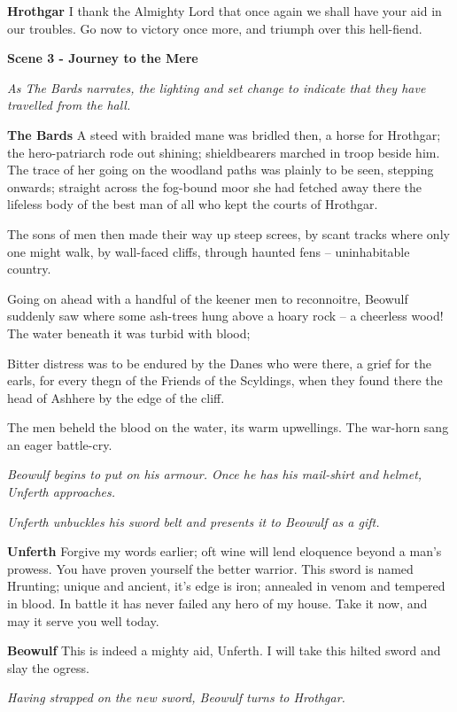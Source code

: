 \documentclass[a4paper]{article}
\begin{document}
{\textbf{Hrothgar} I thank the Almighty Lord
that once again we shall have your aid in our troubles. 
Go now to victory once more,
and triumph over this hell-fiend.

\newpage
\centerline{\textbf{Scene 3 - Journey to the Mere}}
\centerline{\textit{As The Bards narrates, the lighting and set change to indicate that they have travelled from the hall.}}

\textbf{The Bards} A steed with braided mane was bridled then,
a horse for Hrothgar; the hero-patriarch
rode out shining; shieldbearers marched
in troop beside him. The trace of her going
on the woodland paths was plainly to be seen,
stepping onwards; straight across
the fog-bound moor she had fetched away there
the lifeless body of the best man
of all who kept the courts of Hrothgar.

The sons of men then made their way
up steep screes, by scant tracks
where only one might walk, by wall-faced cliffs,
through haunted fens – uninhabitable country.

Going on ahead with a handful of the
keener men to reconnoitre,
Beowulf suddenly saw where some ash-trees
hung above a hoary rock
– a cheerless wood! The water beneath it
was turbid with blood; 

Bitter distress
was to be endured by the Danes who were there,
a grief for the earls, for every thegn
of the Friends of the Scyldings, when they found there
the head of Ashhere by the edge of the cliff.

The men beheld the blood on the water,
its warm upwellings. The war-horn sang
an eager battle-cry.

\centerline{\textit{Beowulf begins to put on his armour. Once he has his mail-shirt and helmet, Unferth approaches.}}
\centerline{\textit{Unferth unbuckles his sword belt and presents it to Beowulf as a gift.}}

\textbf{Unferth} Forgive my words earlier;
oft wine will lend eloquence beyond a man's prowess.
You have proven yourself the better warrior.
This sword is named Hrunting; unique and ancient,
it's edge is iron; annealed in venom and tempered in blood.
In battle it has never failed any hero of my house.
Take it now, and may it serve you well today. 

\textbf{Beowulf} This is indeed a mighty aid, Unferth.
I will take this hilted sword and slay the ogress.

\newpage
\centerline{\textit{Having strapped on the new sword, Beowulf turns to Hrothgar.}}

}
\end{document}
